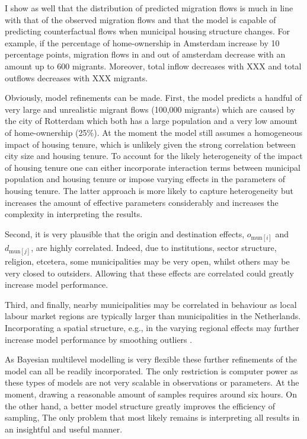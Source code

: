 \documentclass[fleqn,10pt]{SelfArx} %
\begin{document}
{{I show as well that the distribution of predicted migration flows is much in line with that of the observed migration flows and that the model is capable of predicting counterfactual flows when municipal housing structure changes. For example, if the percentage of home-ownership in Amsterdam increase by 10 percentage points, migration flows in and out of amsterdam decrease with an amount up to 600 migrants. Moreover, total inflow decreases with XXX and total outflows decreases with XXX migrants. 

Obviously, model refinements can be made. First, the model predicts a handful of very large and unrealistic migrant flows (100,000 migrants) which are caused by the city of Rotterdam which both has a large population and a very low amount of home-ownership (25\%). At the moment the model still assumes a homogeneous impact of housing tenure, which is unlikely given the strong correlation between city size and housing tenure. To account for the likely heterogeneity of the impact of housing tenure one can either incorporate interaction terms between municipal population and housing tenure or impose varying effects in the parameters of housing tenure. The latter approach is more likely to capture heterogeneity but increases the amount of effective parameters considerably and increases the complexity in interpreting the results. 

Second, it is very plausible that the origin and destination effects, $o_{\text{mun}[i]}$ and $d_{\text{mun}[j]}$, are highly correlated. Indeed, due to institutions, sector structure, religion, etcetera, some municipalities may be very open, whilst others may be very closed to outsiders. Allowing that these effects are correlated could greatly increase model performance. 

Third, and finally, nearby municipalities may be correlated in behaviour as local labour market regions are typically larger than municipalities in the Netherlands. Incorporating a spatial structure, e.g., in the varying regional effects may further increase model performance by smoothing outliers \citep[see][for an example]{congdon2010random}.

As Bayesian multilevel modelling is very flexible these further refinements of the model can all be readily incorporated. The only restriction is computer power as these types of models are not very scalable in observations or parameters. At the moment, drawing a reasonable amount of samples requires around six hours. On the other hand, a better model structure greatly improves the efficiency of sampling, The only problem that most likely remains is interpreting all results in an insightful and useful manner.

}}
\end{document}
